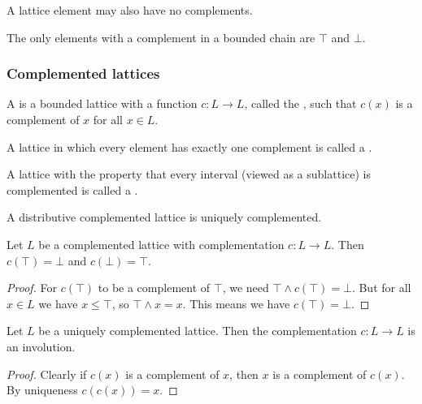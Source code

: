 A lattice element may also have no complements.
\begin{example}
The only elements with a complement in a bounded chain are $\top$ and $\bot$.
\end{example}

\subsubsection{Complemented lattices}
\begin{definition}
A  is a bounded lattice with a function $c:L\to L$, called the , such that $c(x)$ is a complement of $x$ for all $x\in L$.

A lattice in which every element has exactly one complement is called a .

A lattice with the property that every interval (viewed as a sublattice) is complemented is called a .
\end{definition}
A distributive complemented lattice is uniquely complemented.

\begin{lemma}
Let $L$ be a complemented lattice with complementation $c:L\to L$. Then $c(\top) = \bot$ and $c(\bot) = \top$.
\end{lemma}
\begin{proof}
For $c(\top)$ to be a complement of $\top$, we need $\top \wedge c(\top) = \bot$. But for all $x\in L$ we have $x\leq \top$, so $\top\wedge x = x$. This means we have $c(\top) = \bot$.
\end{proof}

\begin{lemma} \label{uniqueComplementInvolution}
Let $L$ be a uniquely complemented lattice. Then the complementation $c:L\to L$ is an involution.
\end{lemma}
\begin{proof}
Clearly if $c(x)$ is a complement of $x$, then $x$ is a complement of $c(x)$. By uniqueness $c(c(x)) = x$.
\end{proof}

